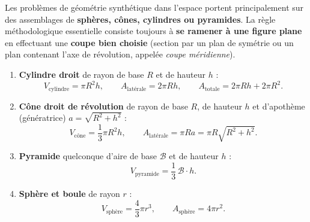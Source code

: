 Les problèmes de géométrie synthétique dans l'espace portent principalement sur des assemblages de \textbf{sphères, cônes, cylindres ou pyramides}. La règle méthodologique essentielle consiste toujours à \textbf{se ramener à une figure plane} en effectuant une \textbf{coupe bien choisie} (section par un plan de symétrie ou un plan contenant l'axe de révolution, appelée \emph{coupe méridienne}).

\begin{theoreme}
\begin{enumerate}
    \item \textbf{Cylindre droit} de rayon de base $R$ et de hauteur $h$ :
    \[
        V_{\text{cylindre}} = \pi R^2 h, \qquad A_{\text{latérale}} = 2\pi R h, \qquad A_{\text{totale}} = 2\pi R h + 2\pi R^2.
    \]
    \item \textbf{Cône droit de révolution} de rayon de base $R$, de hauteur $h$ et d'apothème (génératrice) $a = \sqrt{R^2 + h^2}$ :
    \[
        \boxed{V_{\text{cône}} = \frac{1}{3}\pi R^2 h}, \qquad A_{\text{latérale}} = \pi R a = \pi R\sqrt{R^2+h^2}.
    \]
    \item \textbf{Pyramide} quelconque d'aire de base $\mathcal{B}$ et de hauteur $h$ :
    \[
        V_{\text{pyramide}} = \frac{1}{3}\,\mathcal{B}\cdot h.
    \]
    \item \textbf{Sphère et boule} de rayon $r$ :
    \[
        \boxed{V_{\text{sphère}} = \frac{4}{3}\pi r^3}, \qquad \boxed{A_{\text{sphère}} = 4\pi r^2}.
    \]
\end{enumerate}
\end{theoreme}

